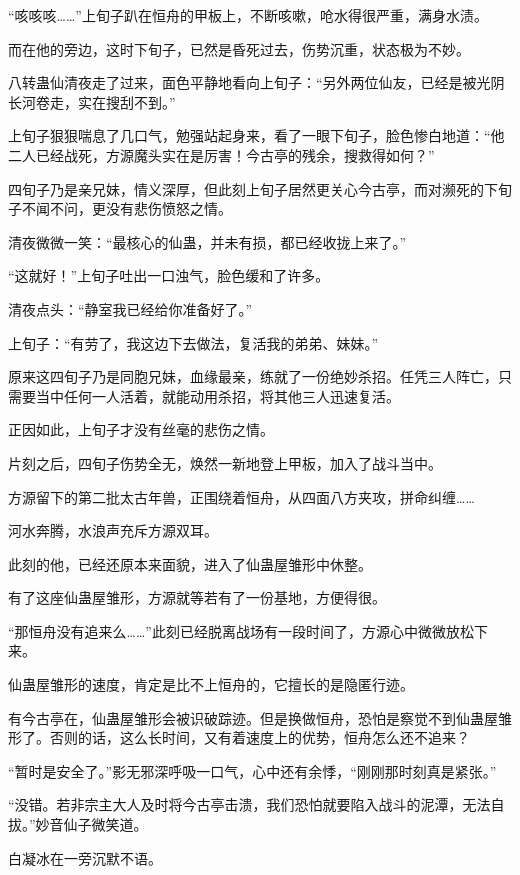 
\begin{this_body}

“咳咳咳……”上旬子趴在恒舟的甲板上，不断咳嗽，呛水得很严重，满身水渍。

而在他的旁边，这时下旬子，已然是昏死过去，伤势沉重，状态极为不妙。

八转蛊仙清夜走了过来，面色平静地看向上旬子：“另外两位仙友，已经是被光阴长河卷走，实在搜刮不到。”

上旬子狠狠喘息了几口气，勉强站起身来，看了一眼下旬子，脸色惨白地道：“他二人已经战死，方源魔头实在是厉害！今古亭的残余，搜救得如何？”

四旬子乃是亲兄妹，情义深厚，但此刻上旬子居然更关心今古亭，而对濒死的下旬子不闻不问，更没有悲伤愤怒之情。

清夜微微一笑：“最核心的仙蛊，并未有损，都已经收拢上来了。”

“这就好！”上旬子吐出一口浊气，脸色缓和了许多。

清夜点头：“静室我已经给你准备好了。”

上旬子：“有劳了，我这边下去做法，复活我的弟弟、妹妹。”

原来这四旬子乃是同胞兄妹，血缘最亲，练就了一份绝妙杀招。任凭三人阵亡，只需要当中任何一人活着，就能动用杀招，将其他三人迅速复活。

正因如此，上旬子才没有丝毫的悲伤之情。

片刻之后，四旬子伤势全无，焕然一新地登上甲板，加入了战斗当中。

方源留下的第二批太古年兽，正围绕着恒舟，从四面八方夹攻，拼命纠缠……

河水奔腾，水浪声充斥方源双耳。

此刻的他，已经还原本来面貌，进入了仙蛊屋雏形中休整。

有了这座仙蛊屋雏形，方源就等若有了一份基地，方便得很。

“那恒舟没有追来么……”此刻已经脱离战场有一段时间了，方源心中微微放松下来。

仙蛊屋雏形的速度，肯定是比不上恒舟的，它擅长的是隐匿行迹。

有今古亭在，仙蛊屋雏形会被识破踪迹。但是换做恒舟，恐怕是察觉不到仙蛊屋雏形了。否则的话，这么长时间，又有着速度上的优势，恒舟怎么还不追来？

“暂时是安全了。”影无邪深呼吸一口气，心中还有余悸，“刚刚那时刻真是紧张。”

“没错。若非宗主大人及时将今古亭击溃，我们恐怕就要陷入战斗的泥潭，无法自拔。”妙音仙子微笑道。

白凝冰在一旁沉默不语。


\end{this_body}
